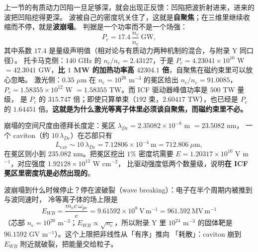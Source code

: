 上一节的有质动力凹陷一旦足够深，就会出现正反馈：凹陷把波折射进来，进来的波把凹陷挖得更深。
波被自己的密度坑关住了，这就是\textbf{自聚焦}；在三维里继续收缩而不停，就是\textbf{波崩塌}。
判据是一个功率而不是一个场强：
\begin{equation}
P_c = 17.4\,\frac{n_c}{n_e}\ \mathrm{GW},
\label{eq:app-al-pc}
\end{equation}
其中系数 $17.4$ 是量级声明值（相对论与有质动力两种机制的混合，与附录 Y 同口径）。
托卡马克侧：$140$ GHz 的 $n_c/n_e = 2.43127$，于是 $P_c = 4.23041\times10^{10}$ W
$= 42.3041$ GW，\textbf{比 $1$ MW 的加热功率高 $42304.1$ 倍}，自聚焦在磁约束里可以放心忽略。
激光侧：$0.35$ $\mu$m 在 $n_e = 10^{26}$ m$^{-3}$ 的冕区给出 $n_c/n_e = 91.0085$，
$P_c = 1.58355\times10^{12}$ W $= 1.58355$ TW。而 ICF 驱动器峰值功率是 $500$ TW 量级，
是 $P_c$ 的 $315.747$ 倍；即使只算单束（$192$ 束，$2.60417$ TW），也已经是
$P_c$ 的 $1.64451$ 倍。\textbf{这就是为什么激光等离子体里必须谈自聚焦，而磁约束里不必。}

崩塌的空间尺度由德拜长度定：冕区 $\lambda_{De} = 2.35082\times10^{-8}$ m $= 23.5082$ nm，
一个 caviton（约 $10\,\lambda_{De}$）在芯部只有
\begin{equation}
L_{\mathrm{cav}} \sim 10\,\lambda_{De} = 7.12806\times10^{-4}\ \mathrm{m}
= 712.806\ \mu\mathrm{m},
\label{eq:app-al-caviton}
\end{equation}
在冕区则小到 $235.082$ nm。把冕区挖出 $1\%$ 密度坑需要
$E = 1.20317\times10^{10}$ V m$^{-1}$，对应强度 $1.92128\times10^{13}$ W cm$^{-2}$，
比驱动强度低两个数量级，说明\textbf{在 ICF 冕区里密度坑是必然出现的}。

波崩塌到什么时候停止？停在波破裂（wave breaking）：电子在半个周期内被推到与波同速时，
冷等离子体的场上限是
\begin{equation}
E_{WB} = \frac{m_ec\,\omega_{pe}}{e} = 9.61592\times10^{8}\ \mathrm{V\,m^{-1}}
= 961.592\ \mathrm{MV\,m^{-1}}
\label{eq:app-al-ewb}
\end{equation}
（芯部 $n_e = 10^{20}$ m$^{-3}$；$E_{WB}\propto\sqrt{n_e}$，所以附录 Y 里
$10^{24}$ m$^{-3}$ 的固体靶是 $96.1592$ GV m$^{-1}$）。这个上限把非线性从「有序」推向
「耗散」：caviton 崩到 $E_{WB}$ 附近就破裂，把能量交给粒子。

